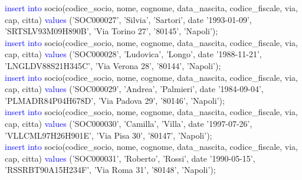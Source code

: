 \documentclass{article}
\begin{document}
\begin{flushleft}
{        \hspace*{0.5em}\textcolor{blue}{insert into} socio(codice\_socio, nome, cognome, data\_nascita, codice\_fiscale, via, \hspace*{0.5em}cap, citta) \textcolor{blue}{values} ('SOC000027', 'Silvia', 'Sartori', date '1993-01-09', \hspace*{0.4em}'SRTSLV93M09H890B', 'Via Torino 27', '80145', 'Napoli'); \\
        \vspace{2mm}
        \hspace*{0.5em}\textcolor{blue}{insert into} socio(codice\_socio, nome, cognome, data\_nascita, codice\_fiscale, via, \hspace*{0.5em}cap, citta) \textcolor{blue}{values} ('SOC000028', 'Ludovica', 'Longo', date '1988-11-21', \hspace*{0.4em}'LNGLDV88S21H345C', 'Via Verona 28', '80144', 'Napoli'); \\
        \vspace{2mm}
        \hspace*{0.5em}\textcolor{blue}{insert into} socio(codice\_socio, nome, cognome, data\_nascita, codice\_fiscale, via, \hspace*{0.5em}cap, citta) \textcolor{blue}{values} ('SOC000029', 'Andrea', 'Palmieri', date '1984-09-04', \hspace*{0.4em}'PLMADR84P04H678D', 'Via Padova 29', '80146', 'Napoli'); \\
        \vspace{2mm}
        \hspace*{0.5em}\textcolor{blue}{insert into} socio(codice\_socio, nome, cognome, data\_nascita, codice\_fiscale, via, \hspace*{0.5em}cap, citta) \textcolor{blue}{values} ('SOC000030', 'Camilla', 'Villa', date '1997-07-26', \hspace*{0.4em}'VLLCML97H26H901E', 'Via Pisa 30', '80147', 'Napoli'); \\
        \vspace{2mm}
        \hspace*{0.5em}\textcolor{blue}{insert into} socio(codice\_socio, nome, cognome, data\_nascita, codice\_fiscale, via, \hspace*{0.5em}cap, citta) \textcolor{blue}{values} ('SOC000031', 'Roberto', 'Rossi', date '1990-05-15', \hspace*{0.4em}'RSSRBT90A15H234F', 'Via Roma 31', '80148', 'Napoli'); \\
        \vspace{2mm}
}
\end{flushleft}
\end{document}
